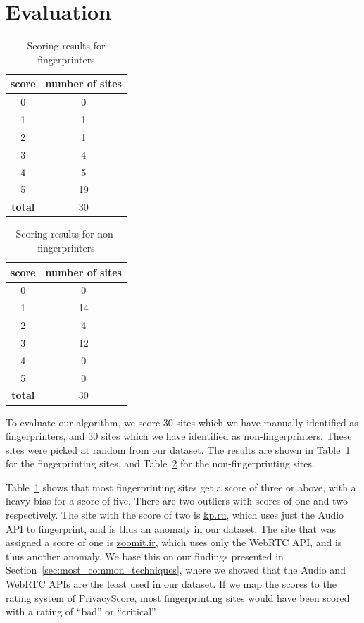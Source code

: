 \documentclass[
    fontsize=12pt,
    headings=small,
    parskip=half,
    bibliography=totoc,
    numbers=noenddot,
    open=any
    ]{scrreprt}
\begin{document}
\section{Evaluation}

\begin{table}
\centering
\caption{Scoring results for fingerprinters}
\begin{tabular}{c c}
    \toprule
    \textbf{score} & \textbf{number of sites} \\
    \midrule
    0 & 0 \\
    1 & 1 \\
    2 & 1 \\
    3 & 4 \\
    4 & 5 \\
    5 & 19 \\
    \midrule
    \textbf{total} & 30 \\
    \bottomrule
\end{tabular}
\label{table:scoring_results_fp}
\end{table}

\begin{table}
\centering
\caption{Scoring results for non-fingerprinters}
\begin{tabular}{c c}
    \toprule
    \textbf{score} & \textbf{number of sites} \\
    \midrule
    0 & 0 \\
    1 & 14 \\
    2 & 4 \\
    3 & 12 \\
    4 & 0 \\
    5 & 0 \\
    \midrule
    \textbf{total} & 30 \\
    \bottomrule
\end{tabular}
\label{table:scoring_results_nonfp}
\end{table}

To evaluate our algorithm, we score 30 sites which we have manually identified as fingerprinters,
and 30 sites which we have identified as non-fingerprinters.
These sites were picked at random from our dataset.
The results are shown in Table~\ref{table:scoring_results_fp} for the fingerprinting sites,
and Table~\ref{table:scoring_results_nonfp} for the non-fingerprinting sites.

Table~\ref{table:scoring_results_fp} shows that most fingerprinting sites get a score of
three or above, with a heavy bias for a score of five.
There are two outliers with scores of one and two respectively. The site with the score of two is \url{kp.ru},
which uses just the Audio API to fingerprint, and is thus an anomaly in our dataset.
The site that was assigned a score of one is \url{zoomit.ir}, which uses only the WebRTC API,
and is thus another anomaly. We base this on our findings presented in Section~\ref{sec:most_common_techniques},
where we showed that the Audio and WebRTC APIs are the least used in our dataset.
If we map the scores to the rating system of PrivacyScore, most fingerprinting sites would have been scored
with a rating of ``bad'' or ``critical''.
\end{document}
